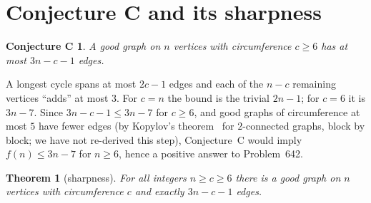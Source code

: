 \documentclass[11pt]{amsart}
\newtheorem{theorem}{Theorem}
\newtheorem*{conjecture}{Conjecture C}
\theoremstyle{remark}
\begin{document}
\section{Conjecture C and its sharpness}

\begin{conjecture}
A good graph on $n$ vertices with circumference $c\ge6$ has at most $3n-c-1$ edges.
\end{conjecture}

A longest cycle spans at most $2c-1$ edges and each of the $n-c$ remaining vertices ``adds'' at most $3$. For $c=n$ the bound is the trivial $2n-1$; for $c=6$ it is $3n-7$. Since $3n-c-1\le3n-7$ for $c\ge6$, and good graphs of circumference at most $5$ have fewer edges (by Kopylov's theorem~\cite{Kop77} for $2$-connected graphs, block by block; we have not re-derived this step), Conjecture~C would imply $f(n)\le3n-7$ for $n\ge6$, hence a positive answer to Problem~642.

\begin{theorem}[sharpness]\label{thm:sharp}
For all integers $n\ge c\ge6$ there is a good graph on $n$ vertices with circumference $c$ and exactly $3n-c-1$ edges.
\end{theorem}
\end{document}
